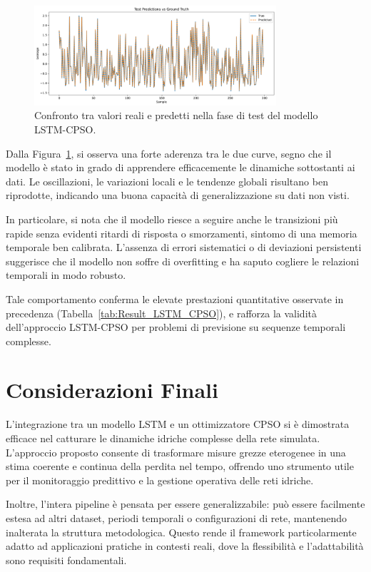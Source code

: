 \documentclass{article}
\begin{document}
\begin{figure}[H]
    \centering
    \includegraphics[width=0.8\textwidth]{img/Test Predict.png}
    \caption{Confronto tra valori reali e predetti nella fase di test del modello LSTM-CPSO.}
    \label{fig:test_predict}
\end{figure}

Dalla Figura~\ref{fig:test_predict}, si osserva una forte aderenza tra le due curve, segno che il 
modello è stato in grado di apprendere efficacemente le dinamiche sottostanti ai dati. Le oscillazioni, 
le variazioni locali e le tendenze globali risultano ben riprodotte, indicando una buona capacità di 
generalizzazione su dati non visti.

In particolare, si nota che il modello riesce a seguire anche le transizioni più rapide senza evidenti 
ritardi di risposta o smorzamenti, sintomo di una memoria temporale ben calibrata. L’assenza di errori 
sistematici o di deviazioni persistenti suggerisce che il modello non soffre di overfitting e ha saputo 
cogliere le relazioni temporali in modo robusto.

Tale comportamento conferma le elevate prestazioni quantitative osservate in precedenza 
(Tabella~\ref{tab:Result_LSTM_CPSO}), e rafforza la validità dell’approccio LSTM-CPSO per problemi di 
previsione su sequenze temporali complesse.

\section{Considerazioni Finali}

L’integrazione tra un modello LSTM e un ottimizzatore CPSO si è dimostrata efficace nel catturare le 
dinamiche idriche complesse della rete simulata. L’approccio proposto consente di trasformare misure 
grezze eterogenee in una stima coerente e continua della perdita nel tempo, offrendo uno strumento utile 
per il monitoraggio predittivo e la gestione operativa delle reti idriche.

Inoltre, l’intera pipeline è pensata per essere generalizzabile: può essere facilmente estesa ad altri 
dataset, periodi temporali o configurazioni di rete, mantenendo inalterata la struttura metodologica. 
Questo rende il framework particolarmente adatto ad applicazioni pratiche in contesti reali, dove la 
flessibilità e l’adattabilità sono requisiti fondamentali.
\end{document}
